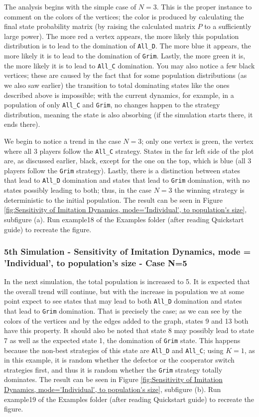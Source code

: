 The analysis begins with the simple case of $N=3$. This is the proper instance to comment on the colors of the vertices; the color is produced by calculating the final state probability matrix (by raising the calculated matrix $P$ to a sufficiently large power). The more red a vertex appears, the more likely this population distribution is to lead to the domination of \texttt{All\_D}. The more blue it appears, the more likely it is to lead to the domination of \texttt{Grim}. Lastly, the more green it is, the more likely it is to lead to \texttt{All\_C} domination. You may also notice a few black vertices; these are caused by the fact that for some population distributions (as we also saw earlier) the transition to total dominating states like the ones described above is impossible; with the current dynamics, for example, in a population of only \texttt{All\_C} and \texttt{Grim}, no changes happen to the strategy distribution, meaning the state is also absorbing (if the simulation starts there, it ends there).

We begin to notice a trend in the case $N=3$; only one vertex is green, the vertex where all 3 players follow the \texttt{All\_C} strategy. States in the far left side of the plot are, as discussed earlier, black, except for the one on the top, which is blue (all 3 players follow the \texttt{Grim} strategy). Lastly, there is a distinction between states that lead to \texttt{All\_D} domination and states that lead to \texttt{Grim} domination, with no states possibly leading to both; thus, in the case $N=3$ the winning strategy is deterministic to the initial population. The result can be seen in Figure \ref{fig:Sensitivity of Imitation Dynamics, mode='Individual', to population's size}, subfigure (a). Run example18 of the Examples folder (after reading Quickstart guide) to recreate the figure.

\subsubsection{5th Simulation - Sensitivity of Imitation Dynamics, mode = 'Individual', to population's size - Case N=5}
In the next simulation, the total population is increased to 5. It is expected that the overall trend will continue, but with the increase in population we at some point expect to see states that may lead to both \texttt{All\_D} domination and states that lead to \texttt{Grim} domination. That is precisely the case; as we can see by the colors of the vertices and by the edges added to the graph, states 9 and 13 both have this property. It should also be noted that state 8 may possibly lead to state 7 as well as the expected state 1, the domination of \texttt{Grim} state. This happens because the non-best strategies of this state are \texttt{All\_D} and \texttt{All\_C}; using $K=1$, as in this example, it is random whether the defector or the cooperator switch strategies first, and thus it is random whether the \texttt{Grim} strategy totally dominates. The result can be seen in Figure \ref{fig:Sensitivity of Imitation Dynamics, mode='Individual', to population's size}, subfigure (b). Run example19 of the Examples folder (after reading Quickstart guide) to recreate the figure.


